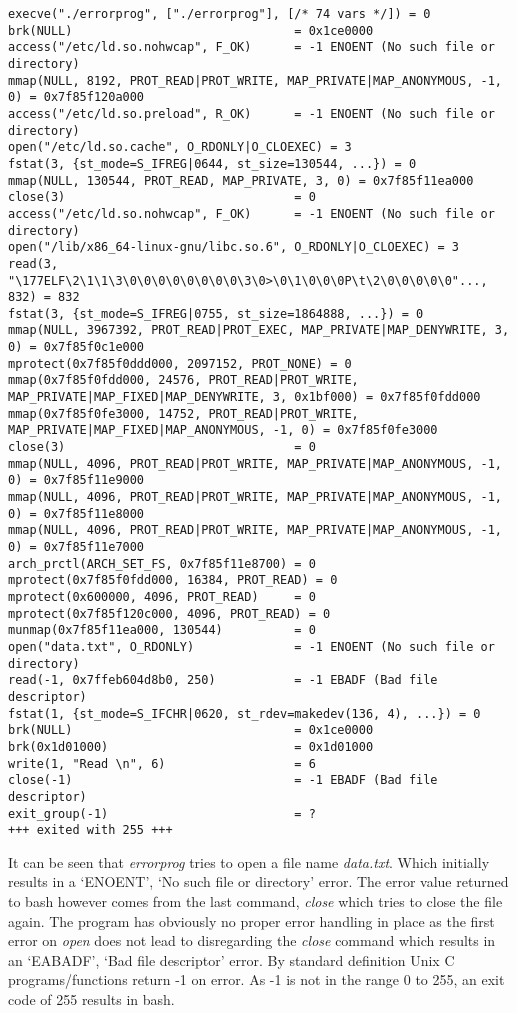 \documentclass[a4paper,11pt,twoside]{article}
\begin{document}
\begin{verbatim}
execve("./errorprog", ["./errorprog"], [/* 74 vars */]) = 0
brk(NULL)                               = 0x1ce0000
access("/etc/ld.so.nohwcap", F_OK)      = -1 ENOENT (No such file or directory)
mmap(NULL, 8192, PROT_READ|PROT_WRITE, MAP_PRIVATE|MAP_ANONYMOUS, -1, 0) = 0x7f85f120a000
access("/etc/ld.so.preload", R_OK)      = -1 ENOENT (No such file or directory)
open("/etc/ld.so.cache", O_RDONLY|O_CLOEXEC) = 3
fstat(3, {st_mode=S_IFREG|0644, st_size=130544, ...}) = 0
mmap(NULL, 130544, PROT_READ, MAP_PRIVATE, 3, 0) = 0x7f85f11ea000
close(3)                                = 0
access("/etc/ld.so.nohwcap", F_OK)      = -1 ENOENT (No such file or directory)
open("/lib/x86_64-linux-gnu/libc.so.6", O_RDONLY|O_CLOEXEC) = 3
read(3, "\177ELF\2\1\1\3\0\0\0\0\0\0\0\0\3\0>\0\1\0\0\0P\t\2\0\0\0\0\0"..., 832) = 832
fstat(3, {st_mode=S_IFREG|0755, st_size=1864888, ...}) = 0
mmap(NULL, 3967392, PROT_READ|PROT_EXEC, MAP_PRIVATE|MAP_DENYWRITE, 3, 0) = 0x7f85f0c1e000
mprotect(0x7f85f0ddd000, 2097152, PROT_NONE) = 0
mmap(0x7f85f0fdd000, 24576, PROT_READ|PROT_WRITE, MAP_PRIVATE|MAP_FIXED|MAP_DENYWRITE, 3, 0x1bf000) = 0x7f85f0fdd000
mmap(0x7f85f0fe3000, 14752, PROT_READ|PROT_WRITE, MAP_PRIVATE|MAP_FIXED|MAP_ANONYMOUS, -1, 0) = 0x7f85f0fe3000
close(3)                                = 0
mmap(NULL, 4096, PROT_READ|PROT_WRITE, MAP_PRIVATE|MAP_ANONYMOUS, -1, 0) = 0x7f85f11e9000
mmap(NULL, 4096, PROT_READ|PROT_WRITE, MAP_PRIVATE|MAP_ANONYMOUS, -1, 0) = 0x7f85f11e8000
mmap(NULL, 4096, PROT_READ|PROT_WRITE, MAP_PRIVATE|MAP_ANONYMOUS, -1, 0) = 0x7f85f11e7000
arch_prctl(ARCH_SET_FS, 0x7f85f11e8700) = 0
mprotect(0x7f85f0fdd000, 16384, PROT_READ) = 0
mprotect(0x600000, 4096, PROT_READ)     = 0
mprotect(0x7f85f120c000, 4096, PROT_READ) = 0
munmap(0x7f85f11ea000, 130544)          = 0
open("data.txt", O_RDONLY)              = -1 ENOENT (No such file or directory)
read(-1, 0x7ffeb604d8b0, 250)           = -1 EBADF (Bad file descriptor)
fstat(1, {st_mode=S_IFCHR|0620, st_rdev=makedev(136, 4), ...}) = 0
brk(NULL)                               = 0x1ce0000
brk(0x1d01000)                          = 0x1d01000
write(1, "Read \n", 6)                  = 6
close(-1)                               = -1 EBADF (Bad file descriptor)
exit_group(-1)                          = ?
+++ exited with 255 +++
\end{verbatim}

It can be seen that \textit{errorprog} tries to open a file name \textit{data.txt}. Which initially results in a `ENOENT', `No such file or directory' error. The error value returned to bash however comes from the last command, \textit{close} which tries to close the file again. The program has obviously no proper error handling in place as the first error on \textit{open} does not lead to disregarding the \textit{close} command which results in an `EABADF', `Bad file descriptor' error. By standard definition Unix C programs/functions return -1 on error. As -1 is not in the range 0 to 255, an exit code of 255 results in bash.
\end{document}
